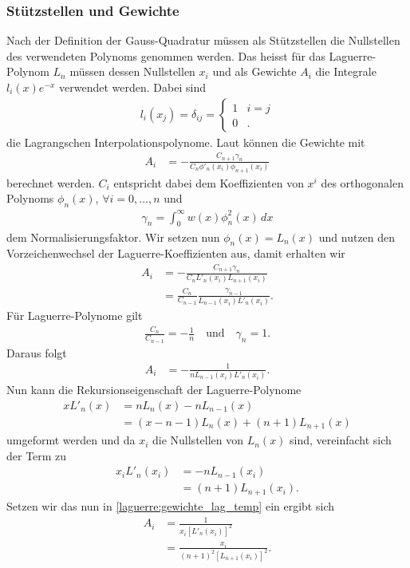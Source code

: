 \subsubsection{Stützstellen und Gewichte}
Nach der Definition der Gauss-Quadratur müssen als Stützstellen die Nullstellen
des verwendeten Polynoms genommen werden.
Das heisst für das Laguerre-Polynom $L_n$ müssen dessen Nullstellen $x_i$ und
als Gewichte $A_i$ die Integrale $l_i(x)e^{-x}$ verwendet werden.
Dabei sind
\begin{align*}
l_i(x_j)
=
\delta_{ij}
=
\begin{cases}
1 & i=j      \\
0 & \text{.}
\end{cases}
\end{align*}
die Lagrangschen Interpolationspolynome.
Laut \cite{laguerre:hildebrand2013introduction} können die Gewichte mit
\begin{align*}
A_i
 & =
-\frac{C_{n+1} \gamma_n}{C_n \phi'_n(x_i) \phi_{n+1} (x_i)}
\end{align*}
berechnet werden.
$C_i$ entspricht dabei dem Koeffizienten von $x^i$
des orthogonalen Polynoms $\phi_n(x)$, $\forall i =0,\ldots,n$ und
\begin{align*}
\gamma_n
=
\int_0^\infty w(x) \phi_n^2(x)\,dx
\end{align*}
dem Normalisierungsfaktor.
Wir setzen nun $\phi_n(x) = L_n(x)$ und
nutzen den Vorzeichenwechsel der Laguerre-Koeffizienten aus,
damit erhalten wir
\begin{align*}
A_i
 & =
-\frac{C_{n+1} \gamma_n}{C_n L'_n(x_i) L_{n+1} (x_i)}
\\
 & = \frac{C_n}{C_{n-1}} \frac{\gamma_{n-1}}{L_{n-1}(x_i) L'_n(x_i)}
.
\end{align*}
Für Laguerre-Polynome gilt
\begin{align*}
\frac{C_n}{C_{n-1}}
=
-\frac{1}{n}
\quad \text{und} \quad
\gamma_n
=
1
.
\end{align*}
Daraus folgt
\begin{align}
A_i
&=
- \frac{1}{n L_{n-1}(x_i) L'_n(x_i)}
.
\label{laguerre:gewichte_lag_temp}
\end{align}
Nun kann die Rekursionseigenschaft der Laguerre-Polynome
\begin{align*}
x L'_n(x) 
&= 
n L_n(x) - n L_{n-1}(x)
\\
&= (x - n - 1) L_n(x) + (n + 1) L_{n+1}(x)
\end{align*}
umgeformt werden und da $x_i$ die Nullstellen von $L_n(x)$ sind,
vereinfacht sich der Term zu
\begin{align*}
x_i L'_n(x_i)
&=
- n L_{n-1}(x_i) 
\\
&=
 (n + 1) L_{n+1}(x_i)
.
\end{align*}
Setzen wir das nun in \eqref{laguerre:gewichte_lag_temp} ein ergibt sich
\begin{align}
\nonumber
A_i
&=
\frac{1}{x_i \left[ L'_n(x_i) \right]^2}
\\
&=
\frac{x_i}{(n+1)^2 \left[ L_{n+1}(x_i) \right]^2}
.
\label{laguerre:quadratur_gewichte}
\end{align}


